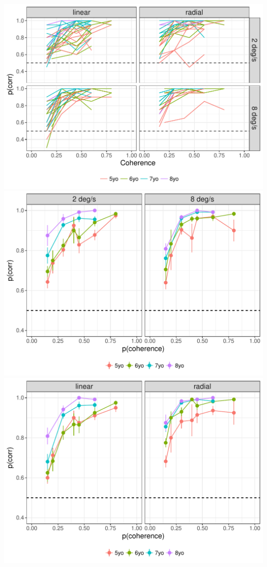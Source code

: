 \documentclass[landscape,final,paperwidth=60in,paperheight=39in,fontscale=0.285]{baposter}
\begin{document}
\begin{poster}
    {
 \begin{center}
 \includegraphics[scale=0.5,valign=t]{img/p-corr-pattern-speed-plot-1.pdf}
 \includegraphics[scale=0.5,valign=t]{img/p-corr-by-speed-and-age-plot-1.pdf}
 \includegraphics[scale=0.5,valign=t]{img/p-corr-by-pattern-and-age-plot-1.pdf}
 \end{center}
}


\end{poster}
\end{document}
